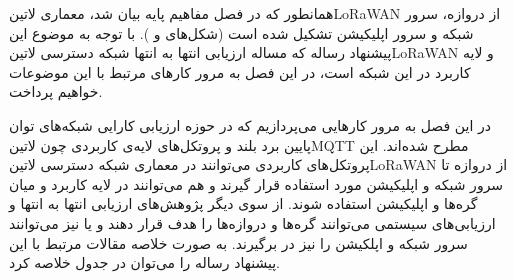 
همانطور که در فصل مفاهیم پایه بیان شد، معماری ‌لاتین{LoRaWAN} از دروازه، سرور شبکه و سرور اپلیکیشن تشکیل شده است
(شکل‌های  و ).
با توجه به موضوع این پیشنهاد رساله که مساله ارزیابی انتها به انتها شبکه دسترسی ‌لاتین{LoRaWAN} و لایه کاربرد در این شبکه است،
در این فصل به مرور کارهای مرتبط با این موضوعات خواهیم پرداخت.

در این فصل به مرور کارهایی می‌پردازیم که در حوزه ارزیابی کارایی شبکه‌های توان پایین برد بلند و پروتکل‌های لایه‌ی کاربردی چون
‌لاتین{MQTT} مطرح شده‌اند. این پروتکل‌های کاربردی می‌توانند در معماری شبکه دسترسی ‌لاتین{LoRaWAN} از دروازه تا سرور شبکه
و اپلیکیشن مورد استفاده قرار گیرند و هم می‌توانند در لایه کاربرد و میان گره‌ها و اپلیکیشن استفاده شوند.
از سوی دیگر پژوهش‌های ارزیابی انتها به انتها و ارزیابی‌های سیستمی می‌توانند گره‌ها و دروازه‌ها را هدف قرار دهند و یا نیز
می‌توانند سرور شبکه و اپلکیشن را نیز در برگیرند.
به صورت خلاصه مقالات مرتبط با این پیشنهاد رساله را می‌توان در جدول
خلاصه کرد.

